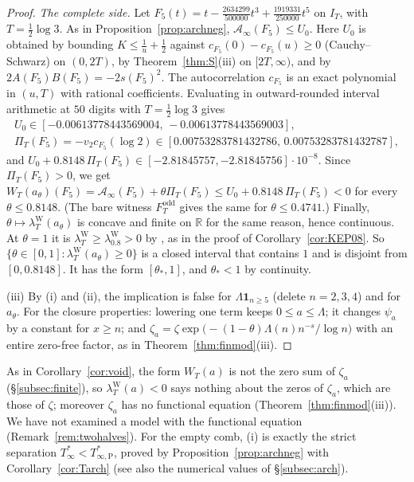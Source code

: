 \documentclass[11pt]{amsart}
\theoremstyle{definition}
\theoremstyle{remark}
\newcommand{\R}{\mathbb R}
\newcommand{\IT}{I_T}
\newcommand{\lamW}{\lambda^{\mathrm W}_T}
\newcommand{\Ainf}{\mathcal A_\infty}
\newcommand{\PiT}{\Pi_T}
\begin{document}
\begin{proof}
\emph{The complete side.} Let
$F_5(t)=t-\frac{2634299}{500000}t^3+\frac{1919331}{250000}t^5$ on $\IT$, with $T=\frac12\log3$. As in
Proposition~\ref{prop:archneg}, $\Ainf(F_5)\le U_0$. Here $U_0$ is obtained by bounding $K\le\frac1u+\frac12$
against $c_{F_5}(0)-c_{F_5}(u)\ge0$ (Cauchy--Schwarz) on $(0,2T)$, by Theorem~\ref{thm:S}(iii) on $[2T,\infty)$,
and by $2A(F_5)B(F_5)=-2s(F_5)^2$. The autocorrelation $c_{F_5}$ is an exact polynomial in $(u,T)$ with rational
coefficients. Evaluating in outward-rounded interval arithmetic at $50$ digits with $T=\frac12\log3$ gives
\begin{gather*}
U_0\in[-0.00613778443569004,\,-0.00613778443569003],\\
\PiT(F_5)=-v_2c_{F_5}(\log2)\in[0.00753283781432786,\,0.00753283781432787],
\end{gather*}
and $U_0+0.8148\,\PiT(F_5)\in[-2.81845757,-2.81845756]\cdot10^{-8}$. Since $\PiT(F_5)>0$, we get
$W_T(a_\theta)(F_5)=\Ainf(F_5)+\theta\PiT(F_5)\le U_0+0.8148\,\PiT(F_5)<0$ for every $\theta\le0.8148$. (The bare
witness $F^{\mathrm{odd}}_T$ gives the same for $\theta\le0.4741$.) Finally, $\theta\mapsto\lambda^{\mathrm W}_T(a_\theta)$
is concave and finite on $\R$ for the same reason, hence continuous. At $\theta=1$ it is
$\lamW\ge\lambda^{\mathrm W}_{0.8}>0$ by \cite[Thm.~1.2]{Zhu2026}, as in the proof of Corollary~\ref{cor:KEP08}. So
$\{\theta\in[0,1]:\lambda^{\mathrm W}_T(a_\theta)\ge0\}$ is a closed interval that contains $1$ and is disjoint from
$[0,0.8148]$. It has the form $[\theta_*,1]$, and $\theta_*<1$ by continuity.

(iii) By (i) and (ii), the implication is false for $\Lambda\mathbf 1_{n\ge5}$ (delete $n=2,3,4$) and for $a_\theta$.
For the closure properties: lowering one term keeps $0\le a\le\Lambda$; it changes $\psi_a$ by a constant for
$x\ge n$; and $\zeta_a=\zeta\exp\big(-(1-\theta)\Lambda(n)n^{-s}/\log n\big)$ with an entire zero-free factor, as in
Theorem~\ref{thm:finmod}(iii).
\end{proof}

As in Corollary~\ref{cor:void}, the form $W_T(a)$ is not the zero sum of $\zeta_a$ (\S\ref{subsec:finite}), so
$\lambda^{\mathrm W}_T(a)<0$ says nothing about the zeros of $\zeta_a$, which are those of $\zeta$; moreover $\zeta_a$
has no functional equation (Theorem~\ref{thm:finmod}(iii)). We have not examined a model with the
functional equation (Remark~\ref{rem:twohalves}). For the empty comb, (i) is exactly the strict separation
$T^*_\infty<T^*_{\infty,\mathrm P}$, proved by Proposition~\ref{prop:archneg} with Corollary~\ref{cor:Tarch}
(see also the numerical values of \S\ref{subsec:arch}).
\end{document}
